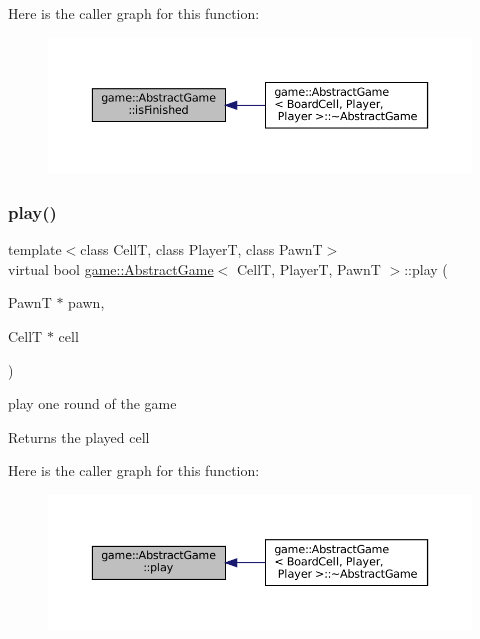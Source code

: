 Here is the caller graph for this function\+:
\nopagebreak
\begin{figure}[H]
\begin{center}
\leavevmode
\includegraphics[width=350pt]{classgame_1_1_abstract_game_a598679eebf40ccc300e9065bce875fd1_icgraph}
\end{center}
\end{figure}
\mbox{\label{classgame_1_1_abstract_game_a5eb974a047c5179c28cf77ec60d77cdc}} 
\subsubsection{\texorpdfstring{play()}{play()}}
{\footnotesize\ttfamily template$<$class CellT, class PlayerT, class PawnT$>$ \\
virtual bool \hyperlink{classgame_1_1_abstract_game}{game\+::\+Abstract\+Game}$<$ CellT, PlayerT, PawnT $>$\+::play (\begin{DoxyParamCaption}\item[{PawnT $\ast$}]{pawn,  }\item[{CellT $\ast$}]{cell }\end{DoxyParamCaption})\hspace{0.3cm}{\ttfamily [pure virtual]}}



play one round of the game 

\begin{DoxyReturn}{Returns}
the played cell 
\end{DoxyReturn}
Here is the caller graph for this function\+:
\nopagebreak
\begin{figure}[H]
\begin{center}
\leavevmode
\includegraphics[width=350pt]{classgame_1_1_abstract_game_a5eb974a047c5179c28cf77ec60d77cdc_icgraph}
\end{center}
\end{figure}
\mbox{\label{classgame_1_1_abstract_game_af6088ae12ed47989dde7f8869e79d934}} 
